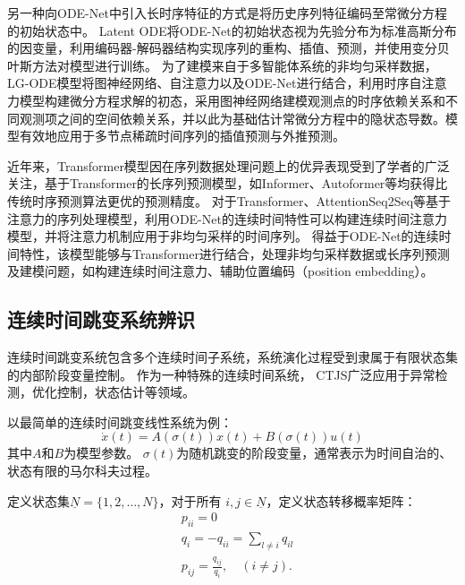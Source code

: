 另一种向ODE-Net中引入长时序特征的方式是将历史序列特征编码至常微分方程的初始状态中。
Latent ODE\cite{10.5555/3454287.3454765}将ODE-Net的初始状态视为先验分布为标准高斯分布的因变量，利用编码器-解码器结构实现序列的重构、插值、预测，并使用变分贝叶斯方法对模型进行训练。
为了建模来自于多智能体系统的非均匀采样数据，LG-ODE模型\cite{Huang2020}将图神经网络、自注意力以及ODE-Net进行结合，利用时序自注意力模型构建微分方程求解的初态，采用图神经网络建模观测点的时序依赖关系和不同观测项之间的空间依赖关系，并以此为基础估计常微分方程中的隐状态导数。模型有效地应用于多节点稀疏时间序列的插值预测与外推预测。

近年来，Transformer模型\cite{Vaswani2017}因在序列数据处理问题上的优异表现受到了学者的广泛关注，基于Transformer的长序列预测模型，如Informer\cite{Zhou2020}、Autoformer\cite{Wu2021}等均获得比传统时序预测算法更优的预测精度。
对于Transformer、AttentionSeq2Seq等基于注意力的序列处理模型，利用ODE-Net的连续时间特性可以构建连续时间注意力模型\cite{chen2021continuous}，并将注意力机制应用于非均匀采样的时间序列。
得益于ODE-Net的连续时间特性，该模型能够与Transformer进行结合，处理非均匀采样数据或长序列预测及建模问题，如构建连续时间注意力\cite{chen2021continuous}、辅助位置编码（position embedding）\cite{Liu2020}。


\subsection{连续时间跳变系统辨识}
连续时间跳变系统包含多个连续时间子系统，系统演化过程受到隶属于有限状态集的内部阶段变量控制\cite{8709809}。
作为一种特殊的连续时间系统，
CTJS广泛应用于异常检测\cite{9165930}，优化控制\cite{pmlr-v120-jansch-porto20a}，状态估计\cite{8709809}等领域。

以最简单的连续时间跳变线性系统\cite{fang2002stabilization}为例：
\begin{equation}
    \dot{x}(t)=A(\sigma(t)) x(t)+B(\sigma(t)) u(t)
\end{equation}
其中$A$和$B$为模型参数。
$\sigma(t)$为随机跳变的阶段变量，通常表示为时间自治的、状态有限的马尔科夫过程。

定义状态集$\underline{N}=\{1,2, \ldots, N\}$，对于所有 $i, j \in \underline{N}$，定义状态转移概率矩阵：
\begin{equation}
    \begin{aligned}
    &p_{i i}=0\\
    &q_i=-q_{i i}=\sum_{l \neq i} q_{i l}\\
    &p_{i j}=\frac{q_{i j}}{q_i}, \quad(i \neq j) .
    \end{aligned}
\end{equation}

